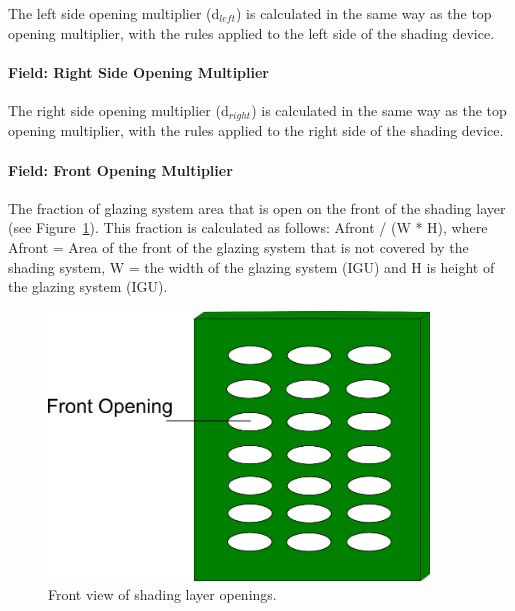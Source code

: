 The left side opening multiplier (d\(_{left}\)) is calculated in the same way as the top opening multiplier, with the rules applied to the left side of the shading device.

\paragraph{Field: Right Side Opening Multiplier}\label{field-right-side-opening-multiplier-1}

The right side opening multiplier (d\(_{right}\)) is calculated in the same way as the top opening multiplier, with the rules applied to the right side of the shading device.

\paragraph{Field: Front Opening Multiplier}\label{field-front-opening-multiplier}

The fraction of glazing system area that is open on the front of the shading layer (see Figure~\ref{fig:front-view-of-shading-layer-openings.}). This fraction is calculated as follows: Afront / (W * H), where Afront = Area of the front of the glazing system that is not covered by the shading system, W = the width of the glazing system (IGU) and H is height of the glazing system (IGU).

\begin{figure}[hbtp] %
\centering
\includegraphics[width=0.9\textwidth, height=0.9\textheight, keepaspectratio=true]{media/image041.png}
\caption{Front view of shading layer openings. \protect \label{fig:front-view-of-shading-layer-openings.}}
\end{figure}

